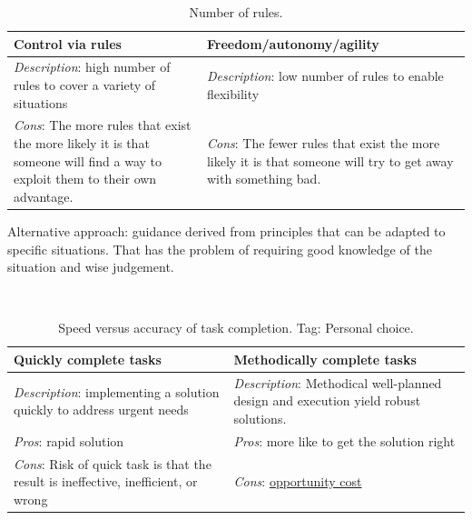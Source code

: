 \begin{center}
\begin{table}[ht]
\begin{tabular}{ | m{\dilemmatablewidth}| m{\dilemmatablewidth} | } 
  \hline
  \textbf{Control via rules} & \textbf{Freedom/autonomy/agility} \\ 
  \hline
  \textit{Description}: high number of rules to cover a variety of situations & 
  \textit{Description}: low number of rules to enable flexibility \\ 
  \hline
  \textit{Cons}: The more rules that exist the more likely it is that someone will find a way to exploit them to their own advantage. & 
  \textit{Cons}: The fewer rules that exist the more likely it is that someone will try to get away with something bad. \\  
  \hline
\end{tabular}
\caption{Number of rules.
}
\label{table:number_of_rules}
\end{table}
\end{center}
Alternative approach: guidance derived from principles that can be adapted to specific situations. That has the problem of requiring good knowledge of the situation and wise judgement.

\ \\

\begin{center}
\begin{table}[ht]
\begin{tabular}{ | m{\dilemmatablewidth}| m{\dilemmatablewidth} | } 
  \hline
  \textbf{Quickly complete tasks} & 
  \textbf{Methodically complete tasks} \\ 
  \hline
  \textit{Description}: implementing a solution quickly to address urgent needs &
  \textit{Description}: Methodical well-planned design and execution yield robust solutions. \\
  \hline
  \textit{Pros}: rapid solution &
  \textit{Pros}: more like to get the solution right \\
  \hline
  \textit{Cons}: Risk of quick task is that the result is ineffective, inefficient, or wrong &
  \textit{Cons}: \href{https://en.wikipedia.org/wiki/Opportunity_cost}{opportunity cost} \\  
  \hline
\end{tabular}
\caption{Speed versus accuracy of task completion.
{\tiny Tag: Personal choice.}
}
\end{table}
\end{center}

